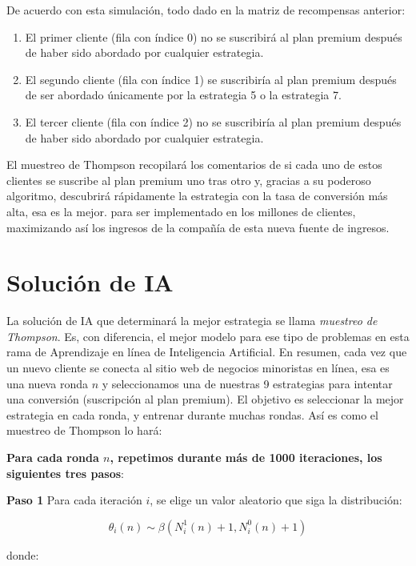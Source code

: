 \documentclass[
]{book}
\providecommand{\tightlist}{%
  \setlength{\itemsep}{0pt}\setlength{\parskip}{0pt}}
\begin{document}
De acuerdo con esta simulación, todo dado en la matriz de recompensas anterior:

\begin{enumerate}
\def\labelenumi{\arabic{enumi}.}
\tightlist
\item
  El primer cliente (fila con índice 0) no se suscribirá al plan premium después de haber sido abordado por cualquier estrategia.
\item
  El segundo cliente (fila con índice 1) se suscribiría al plan premium después de ser abordado únicamente por la estrategia 5 o la estrategia 7.
\item
  El tercer cliente (fila con índice 2) no se suscribiría al plan premium después de haber sido abordado por cualquier estrategia.
\end{enumerate}

El muestreo de Thompson recopilará los comentarios de si cada uno de estos clientes se suscribe al plan premium uno tras otro y, gracias a su poderoso algoritmo, descubrirá rápidamente la estrategia con la tasa de conversión más alta, esa es la mejor. para ser implementado en los millones de clientes, maximizando así los ingresos de la compañía de esta nueva fuente de ingresos.

\hypertarget{soluciuxf3n-de-ia-1}{%
\section{Solución de IA}\label{soluciuxf3n-de-ia-1}}

La solución de IA que determinará la mejor estrategia se llama \emph{muestreo de Thompson}. Es, con diferencia, el mejor modelo para ese tipo de problemas en esta rama de Aprendizaje en línea de Inteligencia Artificial. En resumen, cada vez que un nuevo cliente se conecta al sitio web de negocios minoristas en línea, esa es una nueva ronda \(n\) y seleccionamos una de nuestras 9 estrategias para intentar una conversión (suscripción al plan premium). El objetivo es seleccionar la mejor estrategia en cada ronda, y entrenar durante muchas rondas. Así es como el muestreo de Thompson lo hará:

\textbf{Para cada ronda \(n\), repetimos durante más de 1000 iteraciones, los siguientes tres pasos}:

\textbf{Paso 1} Para cada iteración \(i\), se elige un valor aleatorio que siga la distribución:

\[\theta_i(n) \sim \beta(N_i^1(n)+1,N_i^0(n)+1)\]

donde:
\end{document}
